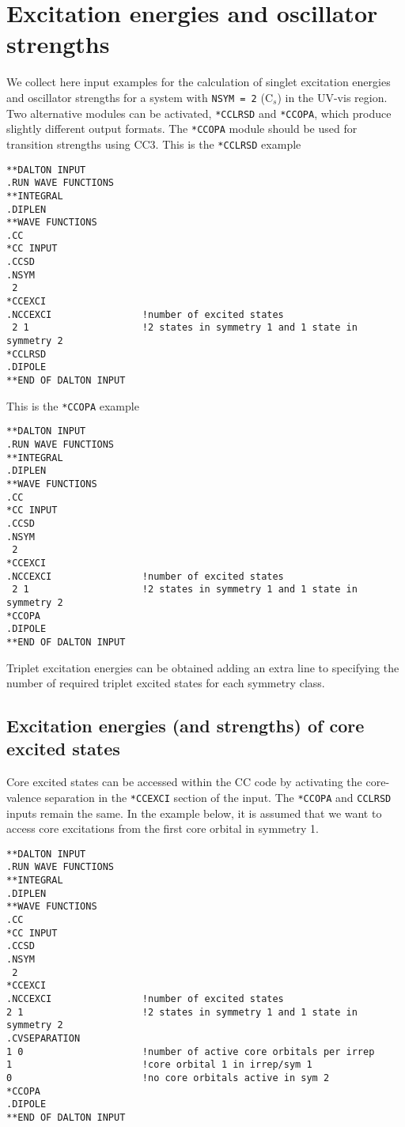\section{Excitation energies and oscillator strengths}
We collect here input examples for the calculation of singlet excitation energies and
oscillator strengths for a system with \verb+NSYM = 2+ (C$_s$) in the UV-vis
region.
Two alternative modules can be activated, \verb+*CCLRSD+ and \verb+*CCOPA+,
which produce slightly different output formats.
The \verb+*CCOPA+ module should be used for transition strengths using CC3.
This is the \verb+*CCLRSD+ example
\begin{verbatim}
**DALTON INPUT
.RUN WAVE FUNCTIONS
**INTEGRAL
.DIPLEN
**WAVE FUNCTIONS
.CC
*CC INPUT
.CCSD
.NSYM
 2
*CCEXCI
.NCCEXCI                !number of excited states
 2 1                    !2 states in symmetry 1 and 1 state in symmetry 2
*CCLRSD
.DIPOLE
**END OF DALTON INPUT
\end{verbatim}  
This is the \verb+*CCOPA+ example
\begin{verbatim}
**DALTON INPUT
.RUN WAVE FUNCTIONS
**INTEGRAL
.DIPLEN
**WAVE FUNCTIONS
.CC
*CC INPUT
.CCSD
.NSYM
 2
*CCEXCI
.NCCEXCI                !number of excited states
 2 1                    !2 states in symmetry 1 and 1 state in symmetry 2
*CCOPA
.DIPOLE
**END OF DALTON INPUT
\end{verbatim}  
Triplet excitation energies can be obtained adding
an extra line to  specifying the number 
of required triplet excited states for each symmetry class.  
\subsection{Excitation energies (and strengths) of core excited states}
Core excited states can be accessed within the CC code
by activating the core-valence separation in the \verb+*CCEXCI+
section of the input. The \verb+*CCOPA+ and \verb+CCLRSD+ 
inputs remain the same.
In the example below, it is assumed that we want to access 
core excitations 
from the first core orbital in symmetry 1.
\begin{verbatim}
**DALTON INPUT
.RUN WAVE FUNCTIONS
**INTEGRAL
.DIPLEN
**WAVE FUNCTIONS
.CC
*CC INPUT
.CCSD
.NSYM
 2
*CCEXCI
.NCCEXCI                !number of excited states
2 1                     !2 states in symmetry 1 and 1 state in symmetry 2
.CVSEPARATION
1 0                     !number of active core orbitals per irrep
1                       !core orbital 1 in irrep/sym 1
0                       !no core orbitals active in sym 2
*CCOPA
.DIPOLE
**END OF DALTON INPUT
\end{verbatim}  


